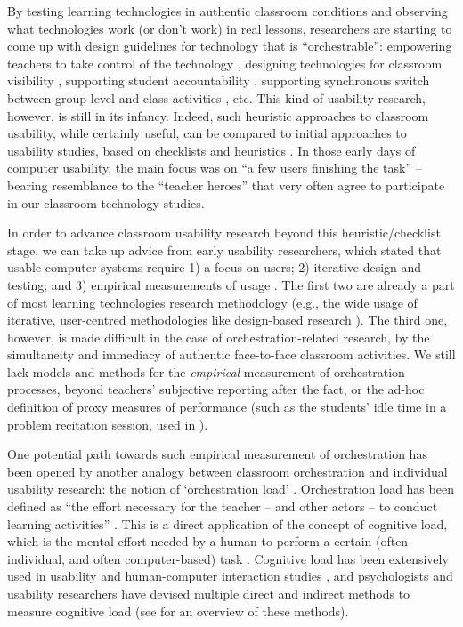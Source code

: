 \documentclass[10pt,journal,compsoc]{IEEEtran}
\begin{document}
By testing learning technologies in authentic classroom conditions and observing what technologies work (or don't work) in real lessons, researchers are starting to come up with design guidelines for technology that is ``orchestrable'': empowering teachers to take control of the technology \cite{Cuendet2013}, designing technologies for classroom visibility \cite{Dillenbourg2013}, supporting student accountability \cite{Kharrufa2013}, supporting synchronous switch between group-level and class activities \cite{Kreitmayer2013}, etc. This kind of usability research, however, is still in its infancy. Indeed, such heuristic approaches to classroom usability, while certainly useful, can be compared to initial approaches to usability studies, based on checklists \cite{ravden1989evaluating} and heuristics \cite{nielsen1992finding}. In those early days of computer usability, the main focus was on ``a few users finishing the task'' \cite{Webusability} -- bearing resemblance to the ``teacher heroes'' \cite{Dillenbourg2009b} that very often agree to participate in our classroom technology studies. 

In order to advance classroom usability research beyond this heuristic/checklist stage, we can take up advice from early usability researchers, which stated that usable computer systems require 1) a focus on users; 2) iterative design and testing; and 3) empirical measurements of usage \cite{Gould1985}. The first two are already a part of most learning technologies research methodology (e.g., the wide usage of iterative, user-centred methodologies like design-based research \cite{wang2005design}). The third one, however, is made difficult in the case of orchestration-related research, by the simultaneity and immediacy of authentic face-to-face classroom activities. We still lack models and methods for the \textit{empirical} measurement of orchestration processes, beyond teachers' subjective reporting after the fact, or the ad-hoc definition of proxy measures of performance (such as the students' idle time in a problem recitation session, used in \cite{Alavi2012}).

One potential path towards such empirical measurement of orchestration has been opened by another analogy between classroom orchestration and individual usability research: the notion of `orchestration load' \cite{Dillenbourg2013}. Orchestration load has been defined as ``the effort necessary for the teacher -- and other actors -- to conduct learning activities'' \cite{Cuendet2013}. This is a direct application of the concept of cognitive load, which is the mental effort needed by a human to perform a certain (often individual, and often computer-based) task \cite{Paas2004}. Cognitive load has been extensively used in usability and human-computer interaction studies \cite{oviatt2004we}, and psychologists and usability researchers have devised multiple direct and indirect methods to measure cognitive load (see \cite{Brunken2003} for an overview of these methods). 
\end{document}
